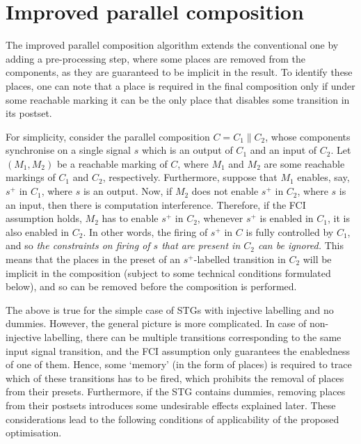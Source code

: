 \section{Improved parallel composition}\label{se-main}

The improved parallel composition algorithm extends the
conventional one by adding a pre-processing step, where some
places are removed from the components, as they are guaranteed
to be implicit in the result. To identify these places, one can
note that a place is required in the final composition only if
under some reachable marking it can be the only place that
disables some transition in its postset.

For simplicity, consider the parallel composition
$C=C_1\parallel C_2$, whose components synchronise on a single
signal $s$ which is an output of $C_1$ and an input of $C_2$.
Let $(M_1,M_2)$ be a reachable marking of $C$, where $M_1$ and
$M_2$ are some reachable markings of $C_1$ and $C_2$,
respectively. Furthermore, suppose that $M_1$ enables, say,
$s^+$ in $C_1$, where $s$ is an output. Now, if $M_2$ does not
enable $s^+$ in $C_2$, where $s$ is an input, then there is
computation interference. Therefore, if the FCI assumption
holds, $M_2$ has to enable $s^+$ in $C_2$, \ie whenever $s^+$
is enabled in $C_1$, it is also enabled in $C_2$. In other
words, the firing of $s^+$ in $C$ is fully controlled by $C_1$,
and so \emph{the constraints on firing of $s$ that are present
in $C_2$ can be ignored.} This means that the places in the
preset of an $s^+$-labelled transition in $C_2$ will be
implicit in the composition (subject to some technical
conditions formulated below), and so can be removed before the
composition is performed.

The above is true for the simple case of STGs with injective
labelling and no dummies. However, the general picture is more
complicated. In case of non-injective labelling, there can be
multiple transitions corresponding to the same input signal
transition, and the FCI assumption only guarantees the
enabledness of one of them. Hence, some `memory' (in the form
of places) is required to trace which of these transitions has
to be fired, which prohibits the removal of places from their
presets. Furthermore, if the STG contains dummies, removing
places from their postsets introduces some undesirable effects
explained later. These considerations lead to the following
conditions of applicability of the proposed optimisation.

